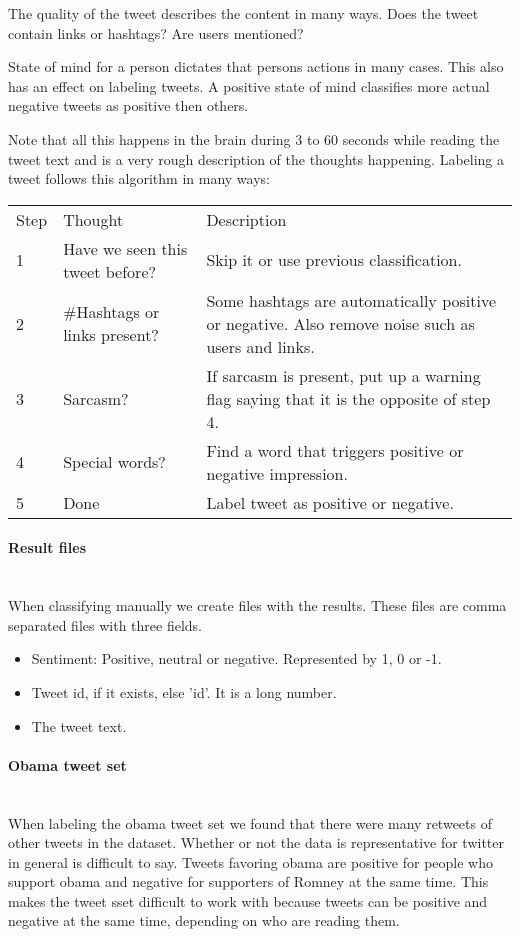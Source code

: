 The quality of the tweet describes the content in many ways. Does the tweet
contain links or hashtags? Are users mentioned?

State of mind for a person dictates that persons actions in many cases. This
also has an effect on labeling tweets. A positive state of mind classifies more
actual negative tweets as positive then others.

Note that all this happens in the brain during 3 to 60 seconds while reading
the tweet text and is a very rough description of the thoughts happening.
Labeling a tweet follows this algorithm in many ways:

\begin{tabular}{ l p{5cm} p{7cm} }
Step & Thought & Description \\
1 & Have we seen this tweet before? & Skip it or use previous classification. \\
2 & \#Hashtags or links present? & Some hashtags are automatically positive or
negative. Also remove noise such as users and links.\\
3 & Sarcasm? & If sarcasm is present, put up a warning flag saying that it is
the opposite of step 4.\\
4 & Special words? & Find a word that triggers positive or negative
impression.\\
5 & Done & Label tweet as positive or negative.\\
\end{tabular}

\paragraph{Result files}
\hspace{0pt}\\
When classifying manually we create files with the results. These files
are comma separated files with three fields.
\begin{itemize}
    \item Sentiment: Positive, neutral or negative. Represented by 1, 0 or -1.
    \item Tweet id, if it exists, else 'id'. It is a long number.
    \item The tweet text.
\end{itemize}

\paragraph{Obama tweet set}
\hspace{0pt}\\
When labeling the obama tweet set we found that there were many retweets of
other tweets in the dataset. Whether or not the data is representative for
twitter in general is difficult to say. Tweets favoring obama are positive for
people who support obama and negative for supporters of Romney at the same
time. This makes the tweet sset difficult to work with because tweets can be
positive and negative at the same time, depending on who are reading them.  

